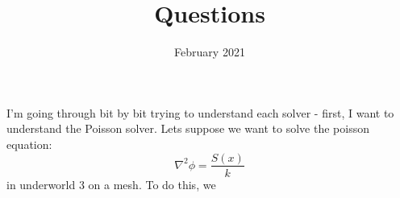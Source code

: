 \documentclass{article}
\title{Questions}
\author{}
\date{February 2021}
\begin{document}
\maketitle

I'm going through bit by bit trying to understand each solver - first, I want to understand the Poisson solver.
\newline
Lets suppose we want to solve the poisson equation:
\begin{equation}
	\nabla^2 \phi = \frac{S(x)}{k}
\end{equation}
in underworld 3 on a mesh.
\newline
To do this, we
\end{document}
